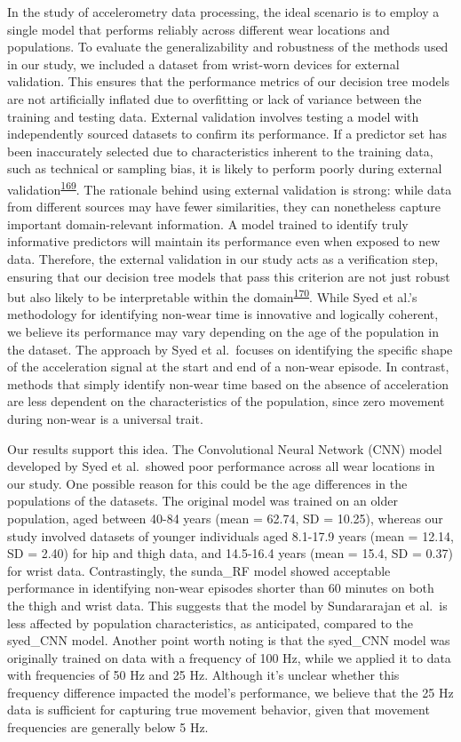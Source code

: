 \documentclass[
  10pt,
]{scrbook}
\begin{document}
In the study of accelerometry data processing, the ideal scenario is to
employ a single model that performs reliably across different wear
locations and populations. To evaluate the generalizability and
robustness of the methods used in our study, we included a dataset from
wrist-worn devices for external validation. This ensures that the
performance metrics of our decision tree models are not artificially
inflated due to overfitting or lack of variance between the training and
testing data. External validation involves testing a model with
independently sourced datasets to confirm its performance. If a
predictor set has been inaccurately selected due to characteristics
inherent to the training data, such as technical or sampling bias, it is
likely to perform poorly during external
validation\textsuperscript{\protect\hyperlink{ref-steyerberg_prediction_2016}{169}}.
The rationale behind using external validation is strong: while data
from different sources may have fewer similarities, they can nonetheless
capture important domain-relevant information. A model trained to
identify truly informative predictors will maintain its performance even
when exposed to new data. Therefore, the external validation in our
study acts as a verification step, ensuring that our decision tree
models that pass this criterion are not just robust but also likely to
be interpretable within the
domain\textsuperscript{\protect\hyperlink{ref-altman_prognosis_2009}{170}}.
While Syed et al.'s methodology for identifying non-wear time is
innovative and logically coherent, we believe its performance may vary
depending on the age of the population in the dataset. The approach by
Syed et al.~focuses on identifying the specific shape of the
acceleration signal at the start and end of a non-wear episode. In
contrast, methods that simply identify non-wear time based on the
absence of acceleration are less dependent on the characteristics of the
population, since zero movement during non-wear is a universal trait.

Our results support this idea. The Convolutional Neural Network (CNN)
model developed by Syed et al.~showed poor performance across all wear
locations in our study. One possible reason for this could be the age
differences in the populations of the datasets. The original model was
trained on an older population, aged between 40-84 years (mean = 62.74,
SD = 10.25), whereas our study involved datasets of younger individuals
aged 8.1-17.9 years (mean = 12.14, SD = 2.40) for hip and thigh data,
and 14.5-16.4 years (mean = 15.4, SD = 0.37) for wrist data.
Contrastingly, the sunda\_RF model showed acceptable performance in
identifying non-wear episodes shorter than 60 minutes on both the thigh
and wrist data. This suggests that the model by Sundararajan et al.~is
less affected by population characteristics, as anticipated, compared to
the syed\_CNN model. Another point worth noting is that the syed\_CNN
model was originally trained on data with a frequency of 100 Hz, while
we applied it to data with frequencies of 50 Hz and 25 Hz. Although it's
unclear whether this frequency difference impacted the model's
performance, we believe that the 25 Hz data is sufficient for capturing
true movement behavior, given that movement frequencies are generally
below 5 Hz.
\end{document}
